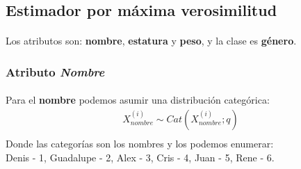 \documentclass[12pt]{article}
\begin{document}
 \subsection{Estimador por máxima verosimilitud}
 \paragraph{} Los atributos son: \textbf{nombre}, \textbf{estatura} y \textbf{peso}, y la clase es \textbf{género}.\\
 \subsubsection{Atributo \textit{Nombre}}
 \paragraph{} Para el \textbf{nombre} podemos asumir una distribución categórica:
  \begin{equation}
  \begin{split}
  X_{nombre}^{(i)}\sim Cat(X_{nombre}^{(i)};q)\\
  \end{split}
  \end{equation}
  Donde las categorías son los nombres y los podemos enumerar:\\
  Denis - 1, Guadalupe - 2, Alex - 3, Cris - 4, Juan - 5, Rene - 6.\\
\end{document}
